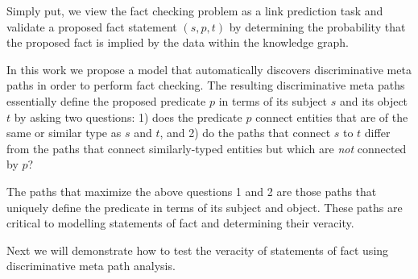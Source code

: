 \documentclass[reprint,twocolumn,showpacs,preprintnumbers,amsmath, aps,pre,amssymb]{revtex4-1}
\newtheorem{definition}{Definition}
\begin{document}
Simply put, we view the fact checking problem as a link prediction task and validate a proposed fact statement $(s, p, t)$ by determining the probability that the proposed fact is implied by the data within the knowledge graph.

In this work we propose a model that automatically discovers discriminative meta paths in order to perform fact checking. The resulting discriminative meta paths essentially define the proposed predicate $p$ in terms of its subject $s$ and its object $t$ by asking two questions: 1) does the predicate $p$ connect entities that are of the same or similar type as $s$ and $t$, and 2) do the paths that connect $s$ to $t$ differ from the paths that connect similarly-typed entities but which are \emph{not} connected by $p$?

The paths that maximize the above questions 1 and 2 are those paths that uniquely define the predicate in terms of its subject and object. These paths are critical to modelling statements of fact and determining their veracity.

Next we will demonstrate how to test the veracity of statements of fact using discriminative meta path analysis. 








\end{document}
